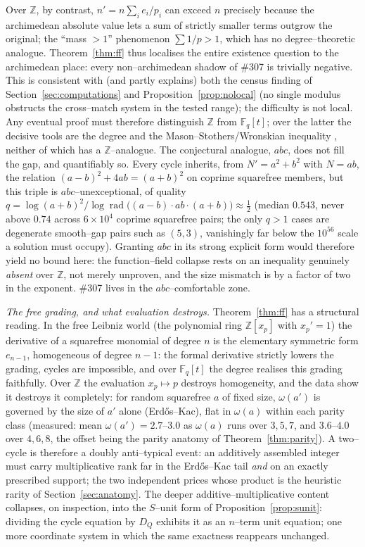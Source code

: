 \documentclass[11pt]{article}
\theoremstyle{definition}
\begin{document}
Over $\mathbb{Z}$, by contrast, $n'=n\sum_i e_i/p_i$ can exceed $n$ precisely because the archimedean
absolute value lets a sum of strictly smaller terms outgrow the original; the ``mass $>1$''
phenomenon $\sum 1/p>1$, which has no degree--theoretic analogue. Theorem~\ref{thm:ff} thus localises
the entire existence question to the archimedean place: every non--archimedean shadow of \#307 is
trivially negative. This is consistent with (and partly explains) both the census finding of
Section~\ref{sec:computations} and Proposition~\ref{prop:nolocal} (no single modulus obstructs the
cross--match system in the tested range); the difficulty is not local. Any eventual proof must therefore distinguish $\mathbb{Z}$ from $\mathbb{F}_q[t]$; over the
latter the decisive tools are the degree and the Mason--Stothers/Wronskian inequality
\cite{Stothers}, neither of which has a $\mathbb{Z}$--analogue. The conjectural analogue, $abc$,
does not fill the gap, and quantifiably so. Every cycle inherits, from $N'=a^2+b^2$ with $N=ab$, the
relation $(a-b)^2+4ab=(a+b)^2$ on coprime squarefree members, but this triple is $abc$--unexceptional,
of quality $q=\log(a+b)^2/\log\operatorname{rad}\!\bigl((a-b)\cdot ab\cdot(a+b)\bigr)\approx\tfrac12$
(median $0.543$, never above $0.74$ across $6\times10^4$ coprime squarefree pairs; the only $q>1$ cases
are degenerate smooth--gap pairs such as $(5,3)$, vanishingly far below the $10^{56}$ scale a solution
must occupy). Granting $abc$ in its strong explicit form would therefore yield no bound here: the
function--field collapse rests on an inequality genuinely \emph{absent} over $\mathbb{Z}$, not merely
unproven, and the size mismatch is by a factor of two in the exponent. \#307 lives in the
$abc$--comfortable zone.

\emph{The free grading, and what evaluation destroys.} Theorem~\ref{thm:ff} has a structural reading. In the free Leibniz world (the polynomial ring
$\mathbb{Z}[x_p]$ with $x_p'=1$) the derivative of a squarefree monomial of degree $n$ is the
elementary symmetric form $e_{n-1}$, homogeneous of degree $n-1$: the formal derivative strictly lowers
the grading, cycles are impossible, and over $\mathbb{F}_q[t]$ the degree realises this grading
faithfully. Over $\mathbb{Z}$ the evaluation $x_p\mapsto p$ destroys homogeneity, and the data show it
destroys it completely: for random squarefree $a$ of fixed size, $\omega(a')$ is governed by the size of
$a'$ alone (Erd\H{o}s--Kac), flat in $\omega(a)$ within each parity class (measured: mean
$\omega(a')=2.7$--$3.0$ as $\omega(a)$ runs over $3,5,7$, and $3.6$--$4.0$ over $4,6,8$, the offset being
the parity anatomy of Theorem~\ref{thm:parity}). A two--cycle is therefore a doubly anti--typical event:
an additively assembled integer must carry multiplicative rank far in the Erd\H{o}s--Kac tail \emph{and}
on an exactly prescribed support; the two independent prices whose product is the heuristic rarity of
Section~\ref{sec:anatomy}. The deeper additive--multiplicative content collapses, on inspection, into
the $S$--unit form of Proposition~\ref{prop:sunit}: dividing the cycle equation by $D_Q$ exhibits it as
an $n$--term unit equation; one more coordinate system in which the same exactness reappears
unchanged.
\end{document}
